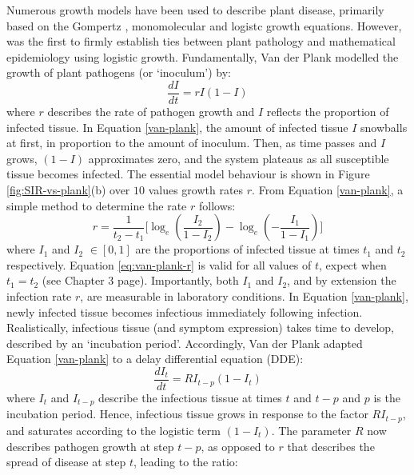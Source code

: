 Numerous growth models have been used to describe plant disease, primarily based on the Gompertz \cite{berger1981comparison}, monomolecular \cite{neher1992underestimation} and logistc \cite{kushalappa1982calculation} growth equations. However, \cite{van2013plant} was the first to firmly establish ties between plant pathology and mathematical epidemiology using logistic growth.
Fundamentally, Van der Plank modelled the growth of plant pathogens (or `inoculum') by:
\begin{equation}
    \label{van-plank}
    \frac{dI}{dt} = rI(1 - I)
\end{equation}
where $r$ describes the rate of pathogen growth and $I$ reflects the proportion of infected tissue.
In Equation \ref{van-plank}, the amount of infected tissue $I$ snowballs at first, 
in proportion to the amount of inoculum. Then, as time passes and $I$ grows, $(1-I)$ approximates zero, 
and the system plateaus as all susceptible tissue becomes infected.
The essential model behaviour is shown in Figure \ref{fig:SIR-vs-plank}(b) over $10$ values growth rates $r$.
From Equation \ref{van-plank}, a simple method to determine the rate $r$ follows:
\begin{equation}
    \label{eq:van-plank-r}
    r =\frac{1}{t_2 - t_1} \big[ \log_{e}(\frac{I_2}{1 - I_2}) - \log_e( - \frac{I_1}{1 - I_1}) \big]
\end{equation}
where $I_1$ and $I_2$ $\in [0, 1]$ are the proportions of infected tissue at times $t_1$ and $t_2$ respectively. Equation \ref{eq:van-plank-r} is valid for all values of $t$, expect when $t_1 = t_2$ (see \cite{van2013plant} Chapter 3 page). Importantly, both $I_1$ and $I_2$, and by extension the infection rate $r$,
are measurable in laboratory conditions. 
In Equation \ref{van-plank}, newly infected tissue becomes infectious immediately following infection.
Realistically, infectious tissue (and symptom expression) takes time to develop, described by an `incubation period'.
Accordingly, Van der Plank adapted Equation \ref{van-plank} to a delay differential equation (DDE):
\begin{equation}
\label{van-plank-incubation}
    \frac{dI_t}{dt} = RI_{t-p}(1 - I_{t})
\end{equation}
where $I_t$ and $I_{t-p}$ describe the infectious tissue at times $t$ and $t-p$ and $p$ is the incubation period. 
Hence, infectious tissue grows in response to the factor $R I_{t-p}$, and saturates
according to the logistic term $(1 - I_t)$. The parameter $R$ now describes pathogen
growth at step $t-p$, as opposed to $r$ that describes the spread of disease at step $t$, leading to the ratio:

